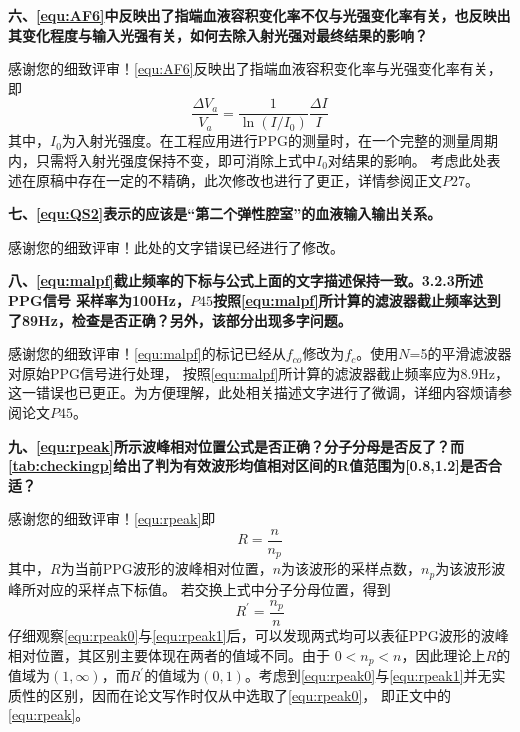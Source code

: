 \textbf{六、\autoref{equ:AF6}中反映出了指端血液容积变化率不仅与光强变化率有关，也反映出其变化程度与输入光强有关，如何去除入射光强对最终结果的影响？}

感谢您的细致评审！\autoref{equ:AF6}反映出了指端血液容积变化率与光强变化率有关，即
\begin{equation}
    \frac{\Delta V_{a}}{V_{a}}=\frac{1}{\ln(I/I_{0})}\frac{\Delta I}{I}
\end{equation}
其中，$I_{0}$为入射光强度。在工程应用进行PPG的测量时，在一个完整的测量周期内，只需将入射光强度保持不变，即可消除上式中$I_{0}$对结果的影响。
考虑此处表述在原稿中存在一定的不精确，此次修改也进行了更正，详情参阅正文$P27$。


\textbf{七、\autoref{equ:QS2}表示的应该是“第二个弹性腔室”的血液输入输出关系。}

感谢您的细致评审！此处的文字错误已经进行了修改。

\textbf{八、\autoref{equ:malpf}截止频率的下标与公式上面的文字描述保持一致。3.2.3所述PPG信号
采样率为100Hz，$P45$按照\autoref{equ:malpf}所计算的滤波器截止频率达到了89Hz，检查是否正确？另外，该部分出现多字问题。}

感谢您的细致评审！\autoref{equ:malpf}的标记已经从$f_{co}$修改为$f_{c}$。使用$N$=5的平滑滤波器对原始PPG信号进行处理，
按照\autoref{equ:malpf}所计算的滤波器截止频率应为8.9Hz，这一错误也已更正。为方便理解，此处相关描述文字进行了微调，详细内容烦请参阅论文$P45$。

\textbf{九、\autoref{equ:rpeak}所示波峰相对位置公式是否正确？分子分母是否反了？而\autoref{tab:checkingp}给出了判为有效波形均值相对区间的R值范围为[0.8,1.2]是否合适？}

感谢您的细致评审！\autoref{equ:rpeak}即
\begin{equation}
    \label{equ:rpeak0}
    R = \frac{n}{n_p}
\end{equation}
其中，$R$为当前PPG波形的波峰相对位置，$n$为该波形的采样点数，$n_p$为该波形波峰所对应的采样点下标值。
若交换上式中分子分母位置，得到
\begin{equation}
    \label{equ:rpeak1}
    R^{'} = \frac{n_p}{n}
\end{equation}
仔细观察\autoref{equ:rpeak0}与\autoref{equ:rpeak1}后，可以发现两式均可以表征PPG波形的波峰相对位置，其区别主要体现在两者的值域不同。由于
$0<n_p<n$，因此理论上$R$的值域为$(1, \infty)$，而$R^{'}$的值域为$(0,1)$。考虑到\autoref{equ:rpeak0}与\autoref{equ:rpeak1}并无实质性的区别，因而在论文写作时仅从中选取了\autoref{equ:rpeak0}，
即正文中的\autoref{equ:rpeak}。

